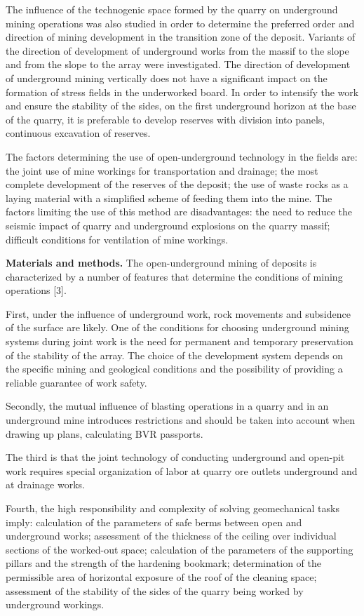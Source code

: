 \begin{multicols}{2}
The influence of the technogenic space formed by the quarry on
underground mining operations was also studied in order to determine the
preferred order and direction of mining development in the transition
zone of the deposit. Variants of the direction of development of
underground works from the massif to the slope and from the slope to the
array were investigated. The direction of development of underground
mining vertically does not have a significant impact on the formation of
stress fields in the underworked board. In order to intensify the work
and ensure the stability of the sides, on the first underground horizon
at the base of the quarry, it is preferable to develop reserves with
division into panels, continuous excavation of reserves.

The factors determining the use of open-underground technology in the
fields are: the joint use of mine workings for transportation and
drainage; the most complete development of the reserves of the deposit;
the use of waste rocks as a laying material with a simplified scheme of
feeding them into the mine. The factors limiting the use of this method
are disadvantages: the need to reduce the seismic impact of quarry and
underground explosions on the quarry massif; difficult conditions for
ventilation of mine workings.

{\bfseries Materials and methods.} The open-underground mining of deposits
is characterized by a number of features that determine the conditions
of mining operations {[}3{]}.

First, under the influence of underground work, rock movements and
subsidence of the surface are likely. One of the conditions for choosing
underground mining systems during joint work is the need for permanent
and temporary preservation of the stability of the array. The choice of
the development system depends on the specific mining and geological
conditions and the possibility of providing a reliable guarantee of work
safety.

Secondly, the mutual influence of blasting operations in a quarry and in
an underground mine introduces restrictions and should be taken into
account when drawing up plans, calculating BVR passports.

The third is that the joint technology of conducting underground and
open-pit work requires special organization of labor at quarry ore
outlets underground and at drainage works.

Fourth, the high responsibility and complexity of solving geomechanical
tasks imply: calculation of the parameters of safe berms between open
and underground works; assessment of the thickness of the ceiling over
individual sections of the worked-out space; calculation of the
parameters of the supporting pillars and the strength of the hardening
bookmark; determination of the permissible area of horizontal exposure
of the roof of the cleaning space; assessment of the stability of the
sides of the quarry being worked by underground workings.


\end{multicols}
